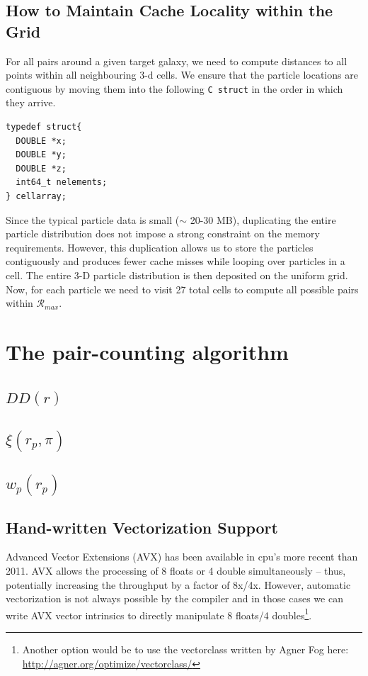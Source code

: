 \documentclass[preprint, 12pt, authoryear]{elsarticle}
\newcommand{\rmax}{\ensuremath{{{\mathcal{R}}_{max}}}\xspace}
\newcommand{\xir}{\ensuremath{{DD(r)}}\xspace}
\newcommand{\wprp}{\ensuremath{{w_p(r_p)}}\xspace}
\newcommand{\xirppi}{\ensuremath{{\xi(r_p,\pi)}}\xspace}
\begin{document}
\subsection{How to Maintain Cache Locality within the Grid}
For all pairs around a given target galaxy, we need to compute distances to all points within all neighbouring 3-d cells. 
We ensure that the particle locations are contiguous by moving them into the following \texttt{C struct} in the order in which they arrive. 

\begin{lstlisting}
typedef struct{
  DOUBLE *x;
  DOUBLE *y;
  DOUBLE *z;
  int64_t nelements;
} cellarray;
\end{lstlisting}

Since the typical particle data is small ($\sim$ 20-30 MB), duplicating the entire particle distribution does not impose a strong 
constraint on the memory requirements. However, this duplication allows us to store the particles contiguously and produces fewer 
cache misses while looping over particles in a cell. 
The entire 3-D particle distribution is then deposited on the uniform grid. Now, for each particle we need to visit 27 total cells to 
compute all possible pairs within \rmax. 

\section{The pair-counting algorithm}

\subsection{\xir}
\subsection{\xirppi}
\subsection{\wprp}
\subsection{}

\subsection{Hand-written Vectorization Support}
Advanced Vector Extensions (AVX) has been available in cpu's more recent than 2011. AVX allows the processing of 8 floats or 4 double simultaneously -- thus, 
potentially increasing the throughput by a factor of 8x/4x. However, automatic vectorization is not always possible by the compiler and in those cases 
we can write AVX vector intrinsics to directly manipulate 8 floats/4 doubles\footnote{Another option would be to use the vectorclass written by Agner Fog here: \url{http://agner.org/optimize/vectorclass/}}. 
\end{document}
